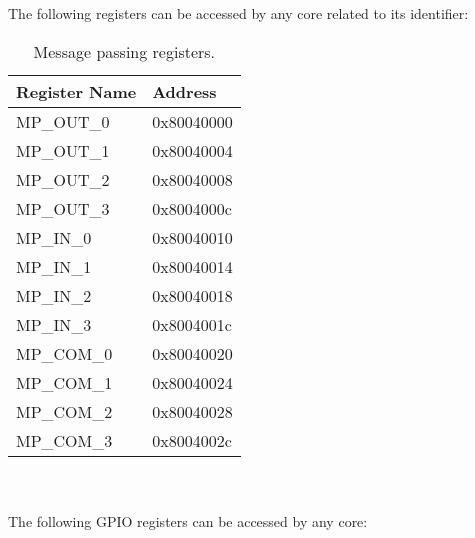 \vspace{2in}
The following registers can be accessed by any core related to its identifier:

\vspace{-3in}
\begin{table}[h]
	{
		\begin{small}
             \begin{center}
	\begin{tabular}{l | l}
		Register Name & Address\\ \hline \hline
MP\_OUT\_0          & 0x80040000\\
MP\_OUT\_1          & 0x80040004\\
MP\_OUT\_2          & 0x80040008\\
MP\_OUT\_3          & 0x8004000c\\
MP\_IN\_0           & 0x80040010\\
MP\_IN\_1           & 0x80040014\\
MP\_IN\_2           & 0x80040018\\
MP\_IN\_3           & 0x8004001c\\
MP\_COM\_0          & 0x80040020\\
MP\_COM\_1          & 0x80040024\\
MP\_COM\_2          & 0x80040028\\
MP\_COM\_3          & 0x8004002c\\
	\end{tabular}
\end{center}
		\end{small}
	}
	\caption{Message passing registers.}
	\label{register_map_2}
\end{table}

\indent \space \\
\indent \space \\

\vspace{10in}
The following GPIO registers can be accessed by any core:

